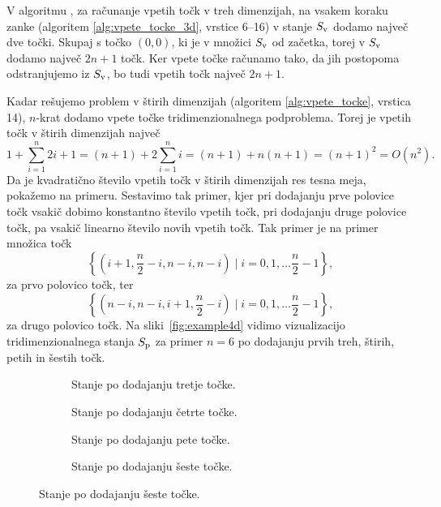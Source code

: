 \begin{dokaz}
V algoritmu , za računanje vpetih točk v treh dimenzijah, na vsakem koraku zanke (algoritem \ref{alg:vpete_tocke_3d}, vrstice 6--16) v stanje $\sv$ dodamo največ dve točki. Skupaj s točko $(0, 0)$, ki je v množici $\sv$ od začetka, torej v $\sv$ dodamo največ $2n + 1$ točk. Ker vpete točke računamo tako, da jih postopoma odstranjujemo iz $\sv$, bo tudi vpetih točk največ $2n + 1$. 
    
Kadar rešujemo problem v štirih dimenzijah  (algoritem \ref{alg:vpete_tocke}, vrstica 14), $n$-krat dodamo vpete točke tridimenzionalnega podproblema. Torej je vpetih točk v štirih dimenzijah največ
\[
1 + \sum_{i=1}^n 2i + 1 = (n + 1) + 2 \sum_{i=1}^n i = (n + 1) + n(n + 1) = (n + 1)^2 = O(n^2).
\] 
Da je kvadratično število vpetih točk v štirih dimenzijah res tesna meja, pokažemo na primeru. Sestavimo tak primer, kjer pri dodajanju prve polovice točk vsakič dobimo konstantno število vpetih točk, pri dodajanju druge polovice točk, pa vsakič linearno število novih vpetih točk. Tak primer je na primer množica točk
\[
\left \{(i + 1, \frac{n}{2} - i, n - i, n - i) \mid  i = 0, 1, \dots \frac{n}{2} - 1 \right \},
\]
za prvo polovico točk, ter 
\[
\left \{(n - i, n - i, i + 1, \frac{n}{2} - i) \mid  i = 0, 1, \dots \frac{n}{2} - 1 \right \},
\]
za drugo polovico točk. Na sliki~\ref{fig:example4d} vidimo vizualizacijo tridimenzionalnega stanja $\sp$ za primer $n = 6$ po dodajanju prvih treh, štirih, petih in šestih točk. 

\begin{figure}[ht]
    \centering
    \begin{subfigure}{0.495\textwidth}
        \centering
        
        \caption{Stanje po dodajanju tretje točke.}
        \label{example4d_1}
    \end{subfigure}
    \hfill
    \begin{subfigure}{0.495\textwidth}
        \centering
        
        \caption{Stanje po dodajanju četrte točke.}
        \label{example4d_2}
    \end{subfigure}

    \vspace{0.5cm}

    \begin{subfigure}{0.495\textwidth}
        \centering
        
        \caption{Stanje po dodajanju pete točke.}
        \label{example4d_3}
    \end{subfigure}
    \hfill
    \begin{subfigure}{0.495\textwidth}
        \centering
        
        \caption{Stanje po dodajanju šeste točke.}
        \label{example4d_4}
    \end{subfigure}


\end{figure}
\end{dokaz}
